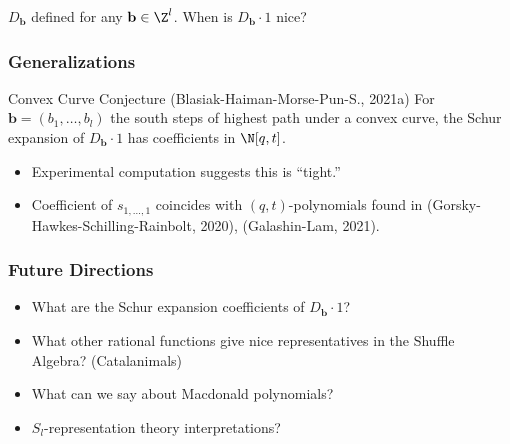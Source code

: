 \documentclass{beamer}
\newcommand{\bb}{{\mathbf b}}
\newcounter{c}
\begin{document}
\begin{frame}
  \(D_\bb\) defined for any \(\bb \in \Z^l\). When is \(D_\bb \cdot
  1\) nice?\pause
  \frametitle{Generalizations}
    \pause
  \begin{block}{Convex Curve Conjecture (Blasiak-Haiman-Morse-Pun-S., 2021a)}
    For \(\bb = (b_1,\ldots,b_l)\) the south steps of highest path
    under a convex curve, the Schur expansion of
    \(D_{\bb} \cdot 1\) has coefficients in \(\N[q,t]\).
  \end{block}\pause
  \begin{itemize}
  \item Experimental computation suggests this is ``tight.''\pause
  \item Coefficient of \(s_{1,\ldots,1}\) coincides with \((q,t)\)-polynomials
    found in (Gorsky-Hawkes-Schilling-Rainbolt, 2020),
    (Galashin-Lam, 2021).
  \end{itemize}
\end{frame}
\begin{frame}
  \frametitle{Future Directions}
  \begin{itemize}
  \item What are the Schur expansion coefficients of \(D_\bb \cdot 1\)?\pause
  \item What other rational functions give nice representatives in the
    Shuffle Algebra? (Catalanimals)\pause
  \item What can we say about Macdonald polynomials?\pause
  \item \(S_l\)-representation theory interpretations?
  \end{itemize}
\end{frame}
\end{document}
